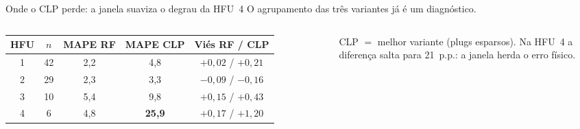 \documentclass[aspectratio=169,10pt]{beamer}
\begin{document}
\begin{frame}{Onde o CLP perde: a janela suaviza o degrau da HFU~4}
  \footnotesize
  O agrupamento das três variantes já é um diagnóstico.
  \vspace{0.06cm}
  \begin{columns}[T,onlytextwidth]
    {\centering
    \scriptsize
    \setlength{\tabcolsep}{4pt}
    \begin{tabular}{ccccc}
      \toprule
      HFU & $n$ & MAPE RF & MAPE CLP & Viés RF / CLP \\
      \midrule
      1 & 42 & 2,2 & 4,8 & $+0{,}02$ / $+0{,}21$ \\
      2 & 29 & 2,3 & 3,3 & $-0{,}09$ / $-0{,}16$ \\
      3 & 10 & 5,4 & 9,8 & $+0{,}15$ / $+0{,}43$ \\
      4 & 6  & 4,8 & \textbf{25,9} & $+0{,}17$ / $+1{,}20$ \\
      \bottomrule
    \end{tabular}
    \par}
    \vspace{0.10cm}
    {\scriptsize CLP $=$ melhor variante (plugs esparsos).
    Na HFU~4 a diferença salta para 21~p.p.: a janela herda o erro físico.}
  \end{columns}
\end{frame}
\end{document}
